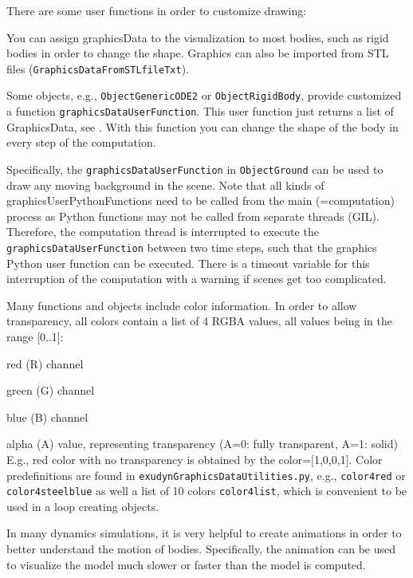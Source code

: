 There are some user functions in order to customize drawing:
\bi
	\item You can assign graphicsData to the visualization to most bodies, such as rigid bodies in order to change the shape. Graphics can also be imported from STL files (\texttt{GraphicsDataFromSTLfileTxt}).
	\item Some objects, e.g., \texttt{ObjectGenericODE2} or \texttt{ObjectRigidBody}, provide customized a function \texttt{graphicsDataUserFunction}. This user function just returns a list of GraphicsData, see . With this function you can change the shape of the body in every step of the computation.
	\item Specifically, the \texttt{graphicsDataUserFunction} in \texttt{ObjectGround} can be used to draw any moving background in the scene.
\ei
Note that all kinds of graphicsUserPythonFunctions need to be called from the main (=computation) process as Python functions may not be called from separate threads (GIL). Therefore, the computation thread is interrupted to execute the \texttt{graphicsDataUserFunction} between two time steps, such that the graphics Python user function can be executed. There is a timeout variable for this interruption of the computation with a warning if scenes get too complicated.

Many functions and objects include color information. In order to allow transparency, all colors contain a list of 4 RGBA values, all values being in the range [0..1]:
\bi
  \item red (R) channel 
	\item green (G) channel  
	\item blue (B) channel 
	\item alpha (A) value, representing transparency (A=0: fully transparent, A=1: solid)
\ei
E.g., red color with no transparency is obtained by the color=[1,0,0,1]. Color predefinitions are found in \texttt{exudynGraphicsDataUtilities.py}, e.g., \texttt{color4red} or \texttt{color4steelblue} as well a list of 10 colors \texttt{color4list}, which is convenient to be used in a loop creating objects.

%
In many dynamics simulations, it is very helpful to create animations in order to better understand the motion of bodies. Specifically, the animation can be used to visualize the model much slower or faster than the model is computed.

